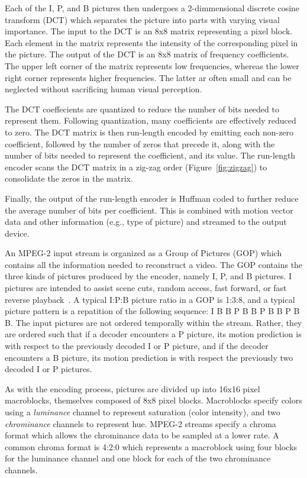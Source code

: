 Each of the I, P, and B pictures then undergoes a 2-dimmensional
discrete cosine transform (DCT) which separates the picture into parts
with varying visual importance. The input to the DCT is an 8x8 matrix
representing a pixel block. Each element in the matrix represents the
intensity of the corresponding pixel in the picture. The output of the
DCT is an 8x8 matrix of frequency coefficients. The upper left corner
of the matrix represents low frequencies, whereas the lower right
corner represents higher frequencies. The latter ar often small and
can be neglected without sacrificing human visual perception.

The DCT coeffecients are quantized to reduce the number of bits needed
to represent them. Following quantization, many coefficients are
effectively reduced to zero. The DCT matrix is then run-length
encoded by emitting each non-zero coefficient, followed by the number
of zeros that precede it, along with the number of bits needed to
represent the coefficient, and its value. The run-length encoder
scans the DCT matrix in a zig-zag order (Figure~\ref{fig:zigzag}) to
consolidate the zeros in the matrix.

Finally, the output of the run-length encoder is Huffman coded to 
further reduce the average number of bits per coefficient. This is
combined with motion vector data and other information (e.g., 
type of picture) and streamed to the output device.


An MPEG-2 input stream is organized as a  Group of Pictures (GOP)
which contains all the information needed to reconstruct a video. The
GOP contains the three kinds of pictures produced by the encoder,
namely I, P, and B pictures. I pictures are intended to assist scene
cuts, random access, fast forward, or fast reverse
playback~\cite{MPEG2, Page 14 6.1.1.7}. A typical I:P:B picture ratio
in a GOP is 1:3:8, and a typical picture pattern is a
repatition of the following sequence: I B B P B B P B B P B B. The
input pictures are not ordered temporally within the stream. Rather,
they are ordered such that if a decoder encounters a P picture, its
motion prediction is with respect to the previously decoded I or P
picture, and if the decoder encounters a B picture, its motion
prediction is with respect the previously two decoded I or P pictures.

As with the encoding process, pictures are divided up into 16x16 pixel
macroblocks, themselves composed of 8x8 pixel blocks. Macroblocks
specify colors using a {\it luminance} channel to represent saturation
(color intensity), and two {\it chrominance} channels to represent
hue. MPEG-2 streams specify a chroma format which allows the
chrominance data to be sampled at a lower rate. A common chroma format
is 4:2:0 which represents a macroblock using four blocks for the
luminance channel and one block for each of the two chrominance
channels.

